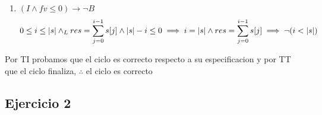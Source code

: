 \documentclass{article}
\begin{document}
\begin{itemize}
{\begin{enumerate}
        \item $(I\land fv\leq0)\to \neg B$\\
        \cont\begin{align}
            \enRangoInc{i}{s} \land_L res=\sum\limits_{j=0}^{i-1}s[j] \land |s|-i\leq0 \implies i=|s| \land res=\sum\limits_{j=0}^{i-1}s[j] \implies \neg (i<|s|)
        \end{align}
    \end{enumerate}
    Por TI probamos que el ciclo es correcto respecto a su especificacion y por TT que el ciclo finaliza, $\therefore$ el ciclo es correcto
}\end{itemize}

\subsection*{Ejercicio 2}
\end{document}
